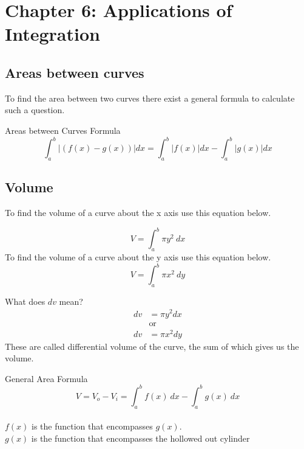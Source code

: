 \documentclass[letterpaper,10pt,twoside,twocolumn,openany]{book}
\begin{document}
\chapter{Chapter 6: Applications of Integration}
\section{Areas between curves}
To find the area between two curves there exist a general formula to calculate such a question.\\
\begin{paperbox}[]{Areas between Curves Formula}
    \begin{equation}
        \int_a^b |(f(x)-g(x))|dx = \int_a^b |f(x)| dx - \int_a^b |g(x)| dx
    \end{equation}
\end{paperbox}


\section{Volume}
\begin{paperbox}[]{}
To find the volume of a curve about the x axis use this equation below.
    
    \begin{equation}
        V = \int_a^b \pi y^2\ dx
    \end{equation}
    To find the volume of a curve about the y axis use this equation below.
    \begin{equation}
        V = \int_a^b \pi x^2\ dy
    \end{equation}
\end{paperbox}
\begin{commentbox}{What does $dv$ mean?}
    \begin{align*}
        dv &= \pi y^2 dx \\
        &\text{or}\\
        dv &= \pi x^2 dy
    \end{align*}
    These are called differential volume of the curve, the sum of which gives us the volume.
\end{commentbox}
\begin{paperbox}{General Area Formula}
    \begin{equation}
        V = V_o - V_i = \int_a^b f(x)\ dx - \int_a^b g(x)\ dx 
    \end{equation}\\
    $f(x)$ is the function that encompasses $g(x)$.
    \\
    $g(x)$ is the function that encompasses the hollowed out cylinder
\end{paperbox}
\end{document}
